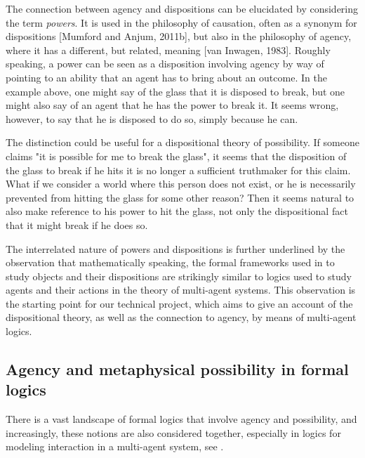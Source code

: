 \documentclass{article}
\begin{document}
The connection between agency and dispositions can be elucidated by considering the term \emph{powers}. It is used in the philosophy of causation, often as a synonym for dispositions [Mumford and Anjum, 2011b], but also in the philosophy of agency, where it has a different, but related, meaning [van Inwagen, 1983]. Roughly
speaking, a power can be seen as a disposition involving agency by way of pointing to
an ability that an agent has to bring about an outcome. In the example above, one
might say of the glass that it is disposed to break, but one might also say of an agent that
he has the power to break it. It seems wrong, however, to say that he is disposed to
do so, simply because he can.

The distinction could be useful for a dispositional theory of possibility. If someone claims "it is possible for me to break the glass", it seems that the disposition of the glass to break if he hits it is no longer a sufficient truthmaker for this claim. What if we consider a world where this person does not exist, or he is necessarily prevented from hitting the glass for some other reason? Then it seems natural to also make reference to his power to hit the glass, not only the dispositional fact that it might break if he does so. 

The interrelated nature of powers and dispositions is further underlined by the observation that mathematically  speaking, the formal frameworks used in \cite{powmod,PhDpos} to study objects and their dispositions are strikingly similar to logics used to study agents and their actions in the theory of multi-agent systems. This observation is the starting point for our technical project, which aims to give an account of the dispositional theory, as well as the connection to agency, by means of multi-agent logics.

\subsection*{Agency and metaphysical possibility in formal logics}

There is a vast landscape of formal logics that involve agency and possibility, and increasingly, these notions are also considered together, especially in logics for modeling interaction in a multi-agent system, see \cite{IMAS,Benthem}.
\end{document}
